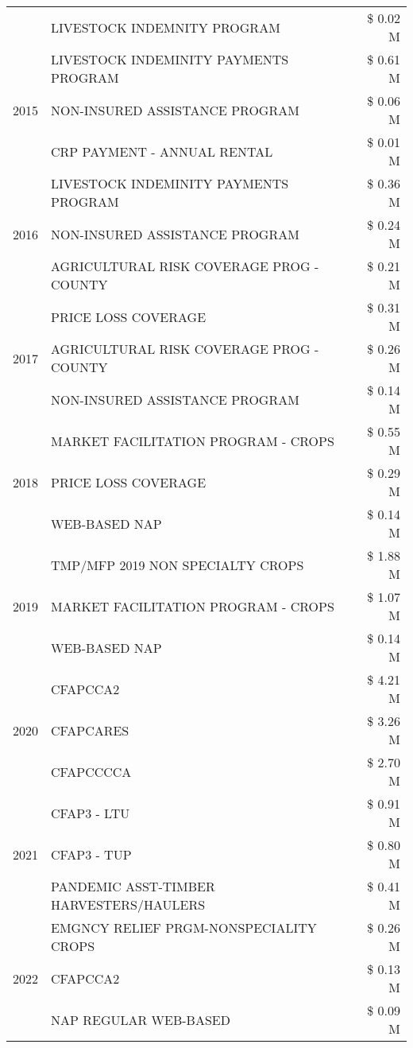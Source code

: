 \begin{tabular}{llr}
 & LIVESTOCK INDEMNITY PROGRAM & \$ 0.02 M \\
\cline{1-3}
\multirow[t]{3}{*}{2015} & LIVESTOCK INDEMINITY PAYMENTS PROGRAM & \$ 0.61 M \\
 & NON-INSURED ASSISTANCE PROGRAM & \$ 0.06 M \\
 & CRP PAYMENT - ANNUAL RENTAL & \$ 0.01 M \\
\cline{1-3}
\multirow[t]{3}{*}{2016} & LIVESTOCK INDEMINITY PAYMENTS PROGRAM & \$ 0.36 M \\
 & NON-INSURED ASSISTANCE PROGRAM & \$ 0.24 M \\
 & AGRICULTURAL RISK COVERAGE PROG - COUNTY & \$ 0.21 M \\
\cline{1-3}
\multirow[t]{3}{*}{2017} & PRICE LOSS COVERAGE & \$ 0.31 M \\
 & AGRICULTURAL RISK COVERAGE PROG - COUNTY & \$ 0.26 M \\
 & NON-INSURED ASSISTANCE PROGRAM & \$ 0.14 M \\
\cline{1-3}
\multirow[t]{3}{*}{2018} & MARKET FACILITATION PROGRAM - CROPS & \$ 0.55 M \\
 & PRICE LOSS COVERAGE & \$ 0.29 M \\
 & WEB-BASED NAP & \$ 0.14 M \\
\cline{1-3}
\multirow[t]{3}{*}{2019} & TMP/MFP 2019 NON SPECIALTY CROPS & \$ 1.88 M \\
 & MARKET FACILITATION PROGRAM - CROPS & \$ 1.07 M \\
 & WEB-BASED NAP & \$ 0.14 M \\
\cline{1-3}
\multirow[t]{3}{*}{2020} & CFAPCCA2 & \$ 4.21 M \\
 & CFAPCARES & \$ 3.26 M \\
 & CFAPCCCCA & \$ 2.70 M \\
\cline{1-3}
\multirow[t]{3}{*}{2021} & CFAP3 - LTU & \$ 0.91 M \\
 & CFAP3 - TUP & \$ 0.80 M \\
 & PANDEMIC ASST-TIMBER HARVESTERS/HAULERS & \$ 0.41 M \\
\cline{1-3}
\multirow[t]{3}{*}{2022} & EMGNCY RELIEF PRGM-NONSPECIALITY CROPS & \$ 0.26 M \\
 & CFAPCCA2 & \$ 0.13 M \\
 & NAP REGULAR WEB-BASED & \$ 0.09 M \\
\cline{1-3}
\bottomrule
\end{tabular}
